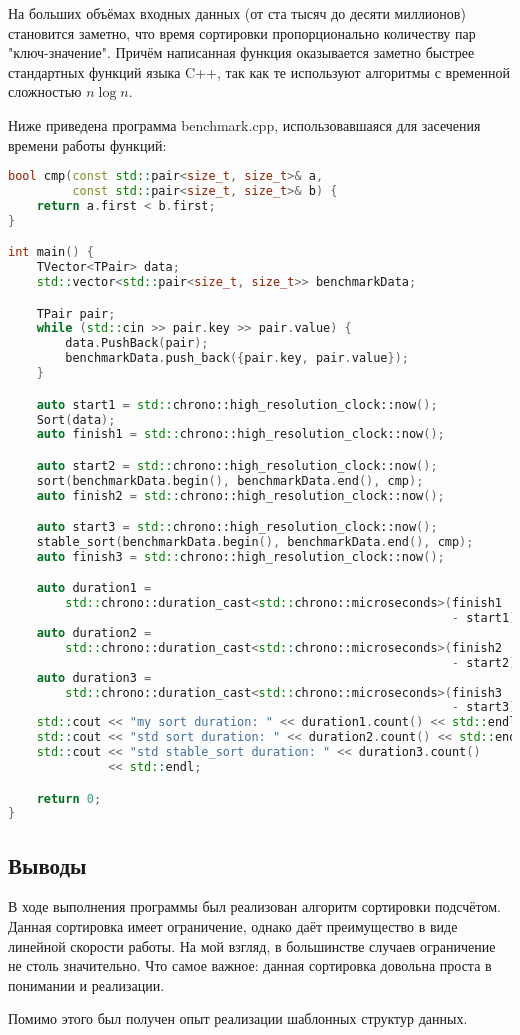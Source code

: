 \documentclass[12pt]{article}
\begin{document}
На больших объёмах входных данных (от ста тысяч до десяти миллионов) становится заметно, что время сортировки пропорционально количеству пар "ключ-значение". Причём написанная функция оказывается заметно быстрее стандартных функций языка C++, так как те используют алгоритмы с временной сложностью $n \log{n}$.

Ниже приведена программа benchmark.cpp, использовавшаяся для засечения времени работы функций:
\begin{lstlisting}[language=C++]
bool cmp(const std::pair<size_t, size_t>& a,
         const std::pair<size_t, size_t>& b) {
    return a.first < b.first;
}

int main() {
    TVector<TPair> data;
    std::vector<std::pair<size_t, size_t>> benchmarkData;

    TPair pair;
    while (std::cin >> pair.key >> pair.value) {
        data.PushBack(pair);
        benchmarkData.push_back({pair.key, pair.value});
    }

    auto start1 = std::chrono::high_resolution_clock::now();
    Sort(data);
    auto finish1 = std::chrono::high_resolution_clock::now();

    auto start2 = std::chrono::high_resolution_clock::now();
    sort(benchmarkData.begin(), benchmarkData.end(), cmp);
    auto finish2 = std::chrono::high_resolution_clock::now();

    auto start3 = std::chrono::high_resolution_clock::now();
    stable_sort(benchmarkData.begin(), benchmarkData.end(), cmp);
    auto finish3 = std::chrono::high_resolution_clock::now();

    auto duration1 =
        std::chrono::duration_cast<std::chrono::microseconds>(finish1
                                                              - start1);
    auto duration2 =
        std::chrono::duration_cast<std::chrono::microseconds>(finish2
                                                              - start2);
    auto duration3 =
        std::chrono::duration_cast<std::chrono::microseconds>(finish3
                                                              - start3);
    std::cout << "my sort duration: " << duration1.count() << std::endl;
    std::cout << "std sort duration: " << duration2.count() << std::endl;
    std::cout << "std stable_sort duration: " << duration3.count()
              << std::endl;

    return 0;
}

\end{lstlisting}

\subsection*{Выводы}

В ходе выполнения программы был реализован алгоритм сортировки подсчётом. Данная сортировка имеет ограничение, однако даёт преимущество в виде линейной скорости работы. На мой взгляд, в большинстве случаев ограничение не столь значительно. Что самое важное: данная сортировка довольна проста в понимании и реализации.

Помимо этого был получен опыт реализации шаблонных структур данных.
\end{document}
